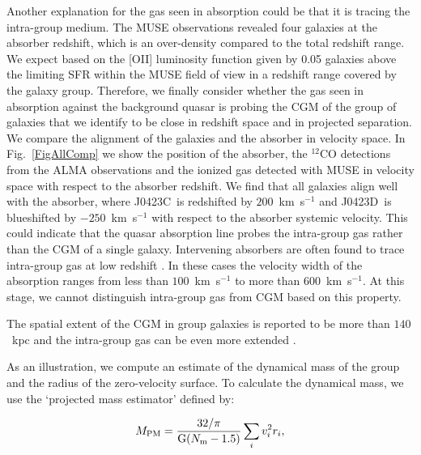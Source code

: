 \documentclass[a4paper,fleqn,usenatbib]{mnras}
\newcommand{\GalC}{J0423C}
\newcommand{\GalD}{J0423D}
\begin{document}
{%
Another explanation for the gas seen in absorption could be that it is tracing the intra-group medium.
The MUSE observations revealed four galaxies at the absorber redshift, which is an over-density compared to the total redshift range. We expect based on the [OII] luminosity function given by \citet{Ly2007luminosity} 0.05 galaxies above the limiting SFR within the MUSE field of view in a redshift range covered by the galaxy group. Therefore, we finally consider whether the gas seen in absorption against the background quasar is probing the CGM of the group of galaxies that we identify to be close in redshift space and in projected separation. We compare the alignment of the galaxies and the absorber in velocity space. In Fig.~\ref{FigAllComp} we show the position of the absorber, the $^{12}$CO detections from the  ALMA observations and the ionized gas detected with MUSE in velocity space with respect to the absorber redshift. We find that all galaxies align well with the absorber, where \GalC\ is redshifted by $200$~km~s$^{-1}$ and \GalD\ is blueshifted by $-250$~km~s$^{-1}$ with respect to the absorber systemic velocity. This could indicate that the quasar absorption line probes the intra-group gas rather than the CGM of a single galaxy. Intervening absorbers are often found to trace intra-group gas at low redshift \citep{Whiting2006mos, Kacprzak2010galaxy, Gauthier2013ultra, Rahmani2017observational, Bielby2017probing, Fumagalli2017witnessing, Peroux2017nature}. In these cases the velocity width of the absorption ranges from less than $100$~km~s$^{-1}$ to more than $600$~km~s$^{-1}$. At this stage, we cannot distinguish intra-group gas from CGM based on this property.

The spatial extent of the CGM in group galaxies is reported to be more than $140$~kpc and the intra-group gas can be even more extended \mbox{\citep{Bordoloi2011radial}}.

As an illustration, we compute an estimate of the dynamical mass of the group and the radius of the zero-velocity surface. To calculate the dynamical mass, we use the `projected mass estimator' \mbox{\citep{Heisler1985estimating}} defined by:

\begin{equation}
M_{\rm PM} = \frac{32/\pi}{\text{G}(N_{\rm m} - 1.5)}\sum_i v_i^2 r_i,
\end{equation}

}
\end{document}
